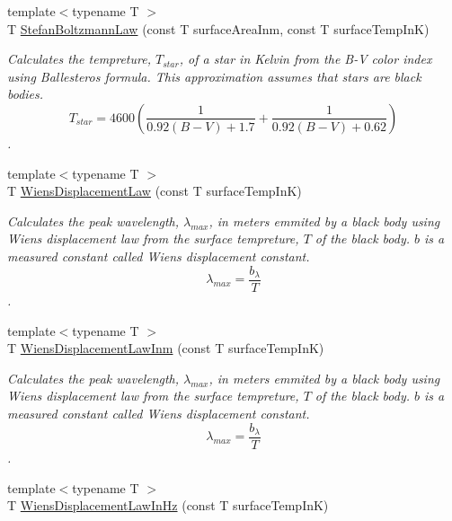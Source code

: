 \begin{DoxyCompactItemize}
{\footnotesize template$<$typename T $>$ }\\T \mbox{\hyperlink{group___e_g_x_phys-_electrodynamics-_black_body-_stefan_boltzmann_law_ga1672439c53b17cdad6cf7b30b94c53d4}{Stefan\+Boltzmann\+Law}} (const T surface\+Area\+Inm, const T surface\+Temp\+InK)
\begin{DoxyCompactList}\small\item\em Calculates the tempreture, $T_{star}$, of a star in Kelvin from the B-\/V color index using Ballesteros\textquotesingle{} formula. This approximation assumes that stars are black bodies. \[T_{star}=4600 \left ( \frac{1}{0.92 (B-V)+ 1.7} + \frac{1}{0.92 (B-V) + 0.62} \right )\]. \end{DoxyCompactList}\item 
{\footnotesize template$<$typename T $>$ }\\T \mbox{\hyperlink{group___e_g_x_phys-_electrodynamics-_black_body-_wiens_displacement_law_ga8f89ce1baac45a1717f604255d04af44}{Wiens\+Displacement\+Law}} (const T surface\+Temp\+InK)
\begin{DoxyCompactList}\small\item\em Calculates the peak wavelength, $\lambda_{max}$, in meters emmited by a black body using Wien\textquotesingle{}s displacement law from the surface tempreture, $T$ of the black body. $b$ is a measured constant called Wien\textquotesingle{}s displacement constant. \[\lambda_{max} = \dfrac{b_\lambda}{T} \]. \end{DoxyCompactList}\item 
{\footnotesize template$<$typename T $>$ }\\T \mbox{\hyperlink{group___e_g_x_phys-_electrodynamics-_black_body-_wiens_displacement_law_ga126ebb146c31a2371f1d1d001d11c62f}{Wiens\+Displacement\+Law\+Inm}} (const T surface\+Temp\+InK)
\begin{DoxyCompactList}\small\item\em Calculates the peak wavelength, $\lambda_{max}$, in meters emmited by a black body using Wien\textquotesingle{}s displacement law from the surface tempreture, $T$ of the black body. $b$ is a measured constant called Wien\textquotesingle{}s displacement constant. \[\lambda_{max} = \dfrac{b_\lambda}{T} \]. \end{DoxyCompactList}\item 
{\footnotesize template$<$typename T $>$ }\\T \mbox{\hyperlink{group___e_g_x_phys-_electrodynamics-_black_body-_wiens_displacement_law_gaf09ffbc9b7133c16da786c1609ecf689}{Wiens\+Displacement\+Law\+In\+Hz}} (const T surface\+Temp\+InK)

\end{DoxyCompactItemize}
